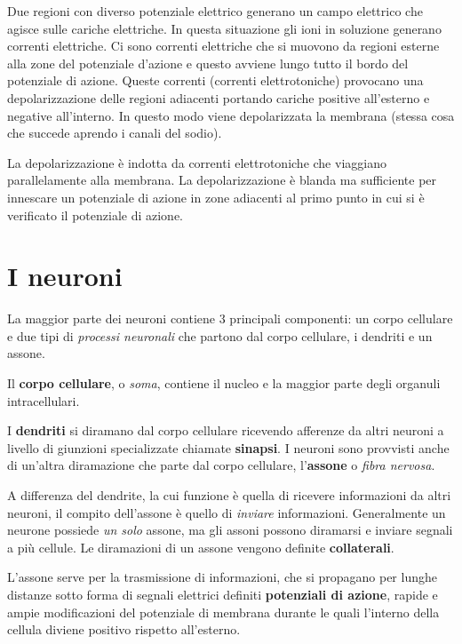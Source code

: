 \documentclass[]{article}
\begin{document}
Due regioni con diverso potenziale elettrico generano un campo elettrico
che agisce sulle cariche elettriche. In questa situazione gli ioni in
soluzione generano correnti elettriche. Ci sono correnti elettriche che
si muovono da regioni esterne alla zone del potenziale d'azione e questo
avviene lungo tutto il bordo del potenziale di azione. Queste correnti
(correnti elettrotoniche) provocano una depolarizzazione delle regioni
adiacenti portando cariche positive all'esterno e negative all'interno.
In questo modo viene depolarizzata la membrana (stessa cosa che succede
aprendo i canali del sodio).

La depolarizzazione è indotta da correnti elettrotoniche che viaggiano
parallelamente alla membrana. La depolarizzazione è blanda ma
sufficiente per innescare un potenziale di azione in zone adiacenti al
primo punto in cui si è verificato il potenziale di azione.

\section{I neuroni}\label{i-neuroni}

La maggior parte dei neuroni contiene 3 principali componenti: un corpo
cellulare e due tipi di \emph{processi neuronali} che partono dal corpo
cellulare, i dendriti e un assone.

Il \textbf{corpo cellulare}, o \emph{soma}, contiene il nucleo e la
maggior parte degli organuli intracellulari.

I \textbf{dendriti} si diramano dal corpo cellulare ricevendo afferenze
da altri neuroni a livello di giunzioni specializzate chiamate
\textbf{sinapsi}. I neuroni sono provvisti anche di un'altra diramazione
che parte dal corpo cellulare, l'\textbf{assone} o \emph{fibra nervosa}.

A differenza del dendrite, la cui funzione è quella di ricevere
informazioni da altri neuroni, il compito dell'assone è quello di
\emph{inviare} informazioni. Generalmente un neurone possiede \emph{un
solo} assone, ma gli assoni possono diramarsi e inviare segnali a più
cellule. Le diramazioni di un assone vengono definite
\textbf{collaterali}.

L'assone serve per la trasmissione di informazioni, che si propagano per
lunghe distanze sotto forma di segnali elettrici definiti
\textbf{potenziali di azione}, rapide e ampie modificazioni del
potenziale di membrana durante le quali l'interno della cellula diviene
positivo rispetto all'esterno.
\end{document}

